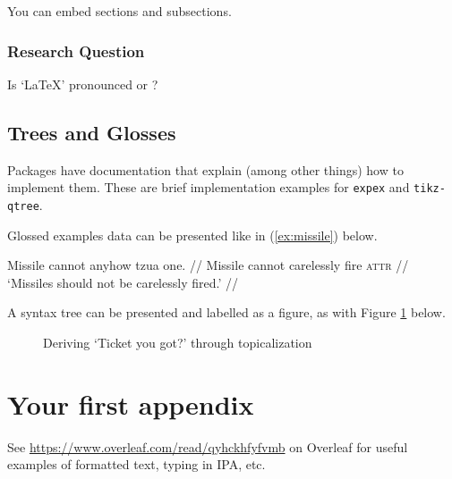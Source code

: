 \documentclass[twoside]{memoir}
\newcommand{\phonet}[1]{\textipa{[#1]}}
\begin{document}
You can embed sections and subsections.

\subsection{Research Question}

Is `\LaTeX' pronounced \phonet{let\super hEk\super h} or \phonet{lat\super hEk\super h}?


\section{Trees and Glosses}

Packages have documentation that explain (among other things) how to implement them. These are brief implementation examples for \texttt{expex} and \texttt{tikz-qtree}. 

Glossed examples data can be presented like in (\ref{ex:missile}) below.

\ex\label{ex:missile}
\begingl
\gla Missile cannot anyhow tzua one. //
\glb Missile cannot carelessly fire \textsc{attr} //
\glft `Missiles should not be carelessly fired.' //
\endgl
\xe

A syntax tree can be presented and labelled as a figure, as with Figure \ref{fig:ticket-topic} below. 

\begin{figure}[h!]
\caption{Deriving `Ticket you got?' through topicalization}
\centering
{}
\label{fig:ticket-topic}
\end{figure}


\appendix
\chapter{Your first appendix}

See \url{https://www.overleaf.com/read/qyhckhfyfvmb} on Overleaf for useful examples of formatted text, typing in IPA, etc.

\backmatter

\end{document}
